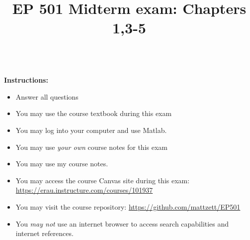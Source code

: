 \documentclass{article}
\begin{document}
\title{EP 501 Midterm exam:  Chapters 1,3-5}

\maketitle

~\\
\textbf{Instructions:}  
\begin{itemize}
  \item  Answer all questions
  \item  You may use the course textbook during this exam
  \item  You may log into your computer and use Matlab.
  \item  You may use \emph{your own} course notes for this exam
  \item  You may use my course notes.  
  \item  You may access the course Canvas site during this exam:  \url{https://erau.instructure.com/courses/101937}
  \item  You may visit the course repository:  \url{https://github.com/mattzett/EP501}  
  \item  You \emph{may not} use an internet browser to access search capabilities and internet references.  
\end{itemize}


\pagebreak
\end{document}
